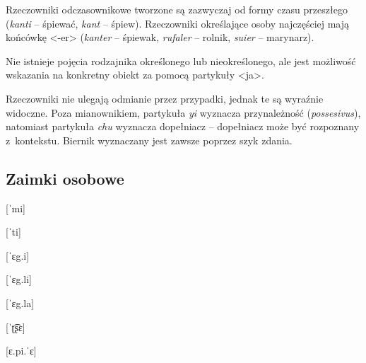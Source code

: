 \begin{spacing}{1.1}
Rzeczowniki odczasownikowe tworzone są zazwyczaj od formy czasu przeszłego
(\emph{kanti} -- śpiewać, \emph{kant} -- śpiew). Rzeczowniki określające osoby
najczęściej mają końcówkę <-er> (\emph{kanter} -- śpiewak, \emph{rufaler} --
rolnik, \emph{suier} -- marynarz).

Nie istnieje pojęcia rodzajnika określonego lub nieokreślonego, ale jest
możliwość wskazania na konkretny obiekt za pomocą partykuły <ja>.


Rzeczowniki nie ulegają odmianie przez przypadki, jednak te są wyraźnie
widoczne. Poza mianownikiem, partykuła \emph{yi} wyznacza przynależność
(\emph{possesivus}), natomiast partykuła \emph{chu} wyznacza dopełniacz --
dopełniacz może być rozpoznany z~kontekstu. Biernik wyznaczany jest zawsze
poprzez szyk zdania.


\subsection{Zaimki osobowe}

\begin{multicols}{2}

[ˈmi]

[ˈti]

[ˈɛg.i]

[ˈɛg.li]

[ˈɛg.la]

[ˈʈ͡ʂɛ]

[ɛ.pi.ˈɛ]


\end{multicols}
\end{spacing}
